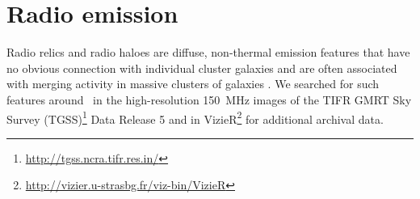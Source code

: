 \section{Radio emission}\label{s:radio}

Radio relics and radio haloes are diffuse, non-thermal emission features that have no obvious
connection with individual cluster galaxies and are often associated with merging activity in
massive clusters of galaxies \citep[see][for a recent review]{feretti12}. We searched for such 
features around \plck\ in the high-resolution 150~MHz images of the TIFR GMRT Sky 
Survey (TGSS)\footnote{\url{http://tgss.ncra.tifr.res.in/}} Data Release 5 and in 
VizieR\footnote{\url{http://vizier.u-strasbg.fr/viz-bin/VizieR}} \citep{ochsenbein00} for 
additional archival data.

